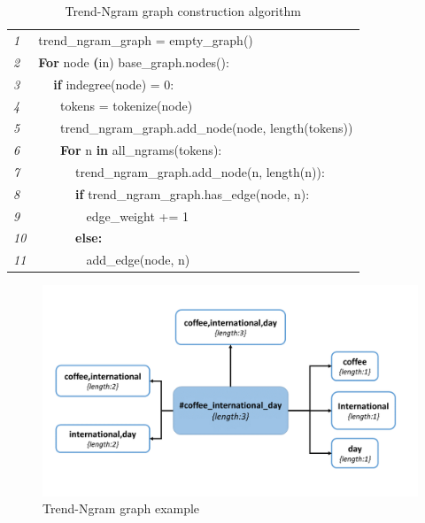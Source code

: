 \documentclass[conference]{IEEEtran}
\begin{document}
\begin{table}
\centering
\begin{tabular}{l|l}
\hline
{\emph{1}} & trend\_ngram\_graph = empty\_graph()\\
{\emph{2}} & \textbf{For} node \textbf(in) base\_graph.nodes():\\
{\emph{3}} &  $\>\>\>\>$ \textbf{if} indegree(node) = 0:\\
{\emph{4}} &  $\>\>\>\>\>\>\>\>$tokens = tokenize(node)\\
{\emph{5}} &  $\>\>\>\>\>\>\>\>$trend\_ngram\_graph.add\_node(node, length(tokens))\\
{\emph{6}} &  $\>\>\>\>\>\>\>\>$\textbf{For} n \textbf{in} all\_ngrams(tokens):\\
{\emph{7}} &  $\>\>\>\>\>\>\>\>\>\>\>\>$ trend\_ngram\_graph.add\_node(n, length(n)):\\
{\emph{8}} &  $\>\>\>\>\>\>\>\>\>\>\>\>$ \textbf{if} trend\_ngram\_graph.has\_edge(node, n):\\
{\emph{9}} &  $\>\>\>\>\>\>\>\>\>\>\>\>\>\>\>\>$ edge\_weight += 1\\
{\emph{10}} & $\>\>\>\>\>\>\>\>\>\>\>\>$ \textbf{else:}\\
{\emph{11}} & $\>\>\>\>\>\>\>\>\>\>\>\>\>\>\>\>$ add\_edge(node, n)\\
\hline
\end{tabular}
\caption{Trend-Ngram graph construction algorithm}
\label{tbl:algorithm2}
\end{table}


\begin{figure}[htb] \centering
\includegraphics[width=\columnwidth]{images/trend_ngram_example.png}
\caption{Trend-Ngram graph example}
\label{fig:tngraph}
\end{figure}
\end{document}
